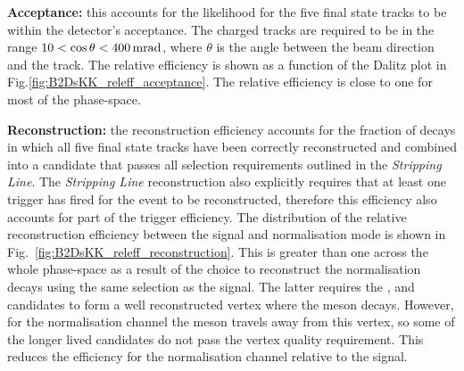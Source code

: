 \begin{description}
\item \textbf{Acceptance:} this accounts for the likelihood for the five final state tracks to be within the \lhcb detector's acceptance. The charged tracks are required to be in the range $10 < \cos\theta < 400 \mathrm{ \,mrad}$, where $\theta$ is the angle between the beam direction and the track. The relative efficiency is shown as a function of the \decay{\Bp}{\Dsp\Kp\Km} Dalitz plot in Fig.\ref{fig:B2DsKK_releff_acceptance}. The relative efficiency is close to one for most of the phase-space. 

\item \textbf{Reconstruction:} the reconstruction efficiency accounts for the fraction of decays in which all five final state tracks have been correctly reconstructed and combined into a \Bp candidate that passes all selection requirements outlined in the \decay{\Bp}{\Dsp\Kp\Km} \emph{Stripping Line}. The \emph{Stripping Line} reconstruction also explicitly requires that at least one trigger has fired for the event to be reconstructed, therefore this efficiency also accounts for part of the trigger efficiency. The distribution of the relative reconstruction efficiency between the signal and normalisation mode is shown in Fig.~\ref{fig:B2DsKK_releff_reconstruction}. This is greater than one across the whole phase-space as a result of the choice to reconstruct the \decay{\Bp}{\Dsp\Dzb} normalisation decays using the same selection as the \decay{\Bp}{\Dsp\Kp\Km} signal. The latter requires the \Dsp, \Kp and \Km candidates to form a well reconstructed vertex where the \Bp meson decays. However, for the normalisation channel the \Dzb meson travels away from this vertex, so some of the longer lived \Dzb candidates do not pass the vertex quality requirement. This reduces the efficiency for the normalisation channel relative to the signal.

\end{description}
